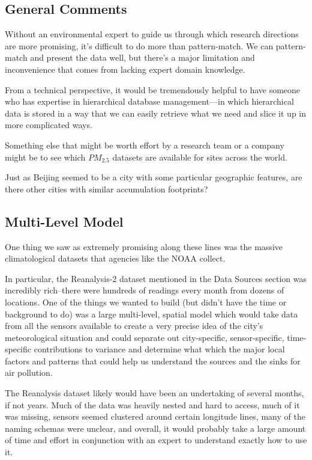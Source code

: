 \documentclass[11pt]{article} %
\begin{document}
\subsection{General Comments}

Without an environmental expert to guide us through which research directions are more promising, 
it's difficult to do more than pattern-match. We can pattern-match and present the data well, but there's a major
limitation and inconvenience that comes from lacking expert domain knowledge.

From a technical perspective, 
it would be tremendously helpful to have someone who has expertise 
in hierarchical database management---in which hierarchical data is stored in a way 
that we can easily retrieve what we need and slice it up in more complicated ways.

Something else that might be worth effort by a research team or a company might be
to see which \(PM_{2.5}\) datasets are available for sites across the world.

Just as Beijing seemed to be a city with some
particular geographic features, are there other cities with similar accumulation footprints?

\subsection{Multi-Level Model}

One thing we saw as extremely promising along these lines was the massive climatological datasets that agencies like the NOAA collect.

In particular, the Reanalysis-2 dataset mentioned in the Data Sources section was incredibly rich--there were hundreds of readings
every month from dozens of locations. One of the things we wanted to build (but didn't have the time or background to do)
was a large multi-level, spatial model which would take data from all the sensors available to create a very precise idea
of the city's meteorological situation and could separate out city-specific, sensor-specific, time-specific contributions to variance
and determine what which the major local factors and patterns that could help us understand the sources and the sinks for
air pollution. 

The Reanalysis dataset likely would have been an undertaking of several months, if not years.
Much of the data was heavily nested and hard to access, much of it was missing, sensors seemed clustered around certain longitude lines,
many of the naming schemas were unclear, and overall, it would probably take a large amount of time and effort 
in conjunction with an expert to understand exactly how to use it.
\end{document}
